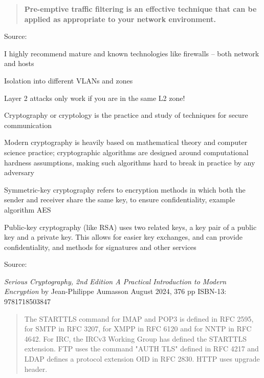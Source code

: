 \documentclass[Screen16to9,17pt]{foils}
\begin{document}
\begin{quote}
{\bf Pre-emptive traffic filtering is an effective technique that can be applied as appropriate to your network environment.}
\end{quote}
Source: 

\begin{list2}
\item I highly recommend mature and known technologies like firewalls -- both network and hosts
\item Isolation into different VLANs and zones
\item Layer 2 attacks only work if you are in the same L2 zone!
\end{list2}




\begin{list1}
\item Cryptography or cryptology is the practice and study of techniques for secure communication
\item Modern cryptography is heavily based on mathematical theory and computer science practice; cryptographic algorithms are designed around computational hardness assumptions, making such algorithms hard to break in practice by any adversary
\item Symmetric-key cryptography refers to encryption methods in which both the sender and receiver share the same key, to ensure confidentiality, example algorithm AES
\item Public-key cryptography (like RSA) uses two related keys, a key pair of a public key and a private key. This allows for easier key exchanges, and can provide confidentiality, and methods for signatures and other services
\end{list1}

Source: 





\emph{Serious Cryptography, 2nd Edition
A Practical Introduction to Modern Encryption}
by Jean-Philippe Aumasson
August 2024, 376 pp
ISBN-13:
9781718503847




\begin{quote}
The STARTTLS command for IMAP and POP3 is defined in RFC 2595, for SMTP in RFC 3207, for XMPP in RFC 6120 and for NNTP in RFC 4642. For IRC, the IRCv3 Working Group
 has defined the STARTTLS extension. FTP uses the command "AUTH TLS" defined in RFC 4217 and LDAP defines a protocol extension OID in RFC 2830. HTTP uses upgrade header.
\end{quote}
\end{document}
